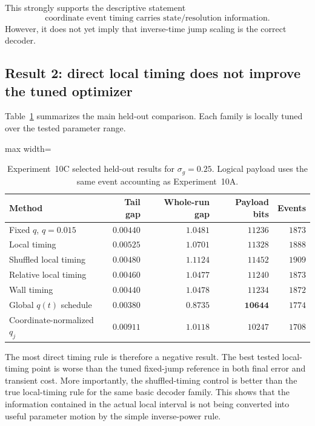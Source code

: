 This strongly supports the descriptive statement
\begin{equation}
  \boxed{\text{coordinate event timing carries state/resolution information.}}
\end{equation}
However, it does not yet imply that inverse-time jump scaling is the correct decoder.

\subsection{Result 2: direct local timing does not improve the tuned optimizer}

Table~\ref{tab:exp10c_primary} summarizes the main held-out comparison. Each family is locally tuned over the tested parameter range.

\begin{table}[ht]
  \centering
  \small
  \caption{Experiment~10C selected held-out results for $\sigma_g=0.25$. Logical payload uses the same event accounting as Experiment~10A.}
  \label{tab:exp10c_primary}
  \begin{adjustbox}{max width=\textwidth}
\begin{tabular}{lrrrr}
    \toprule
    Method & Tail gap & Whole-run gap & Payload bits & Events \\
    \midrule
    Fixed $q$, $q=0.015$ & $0.00440$ & $1.0481$ & $11236$ & $1873$ \\
    Local timing & $0.00525$ & $1.0701$ & $11328$ & $1888$ \\
    Shuffled local timing & $0.00480$ & $1.1124$ & $11452$ & $1909$ \\
    Relative local timing & $0.00460$ & $1.0477$ & $11240$ & $1873$ \\
    Wall timing & $0.00440$ & $1.0478$ & $11234$ & $1872$ \\
    Global $q(t)$ schedule & $\mathbf{0.00380}$ & $\mathbf{0.8735}$ & $\mathbf{10644}$ & $1774$ \\
    Coordinate-normalized $q_j$ & $0.00911$ & $1.0118$ & $10247$ & $1708$ \\
    \bottomrule
  \end{tabular}
\end{adjustbox}
\end{table}

The most direct timing rule is therefore a negative result. The best tested local-timing point is worse than the tuned fixed-jump reference in both final error and transient cost. More importantly, the shuffled-timing control is better than the true local-timing rule for the same basic decoder family. This shows that the information contained in the actual local interval is not being converted into useful parameter motion by the simple inverse-power rule.

